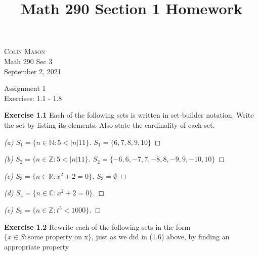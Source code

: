 \documentclass[12pt,oneside]{article}
\newenvironment{exercise}[1]{\vspace{.1in}\noindent\textbf{Exercise #1 \hspace{.05em}}}{}
\newcommand{\R}{\mathbb{R}}
\newcommand{\C}{\mathbb{C}}
\newcommand{\Z}{\mathbb{Z}}
\newcommand{\N}{\mathbb{N}}
\begin{document}
\title{Math 290 Section 1 Homework}

\begin{flushright}
\textsc{Colin Mason}  \\
Math 290 Sec 3\\
September 2, 2021
\end{flushright}

\begin{center}
\textsf{Assignment 1} \\
\textsf{Exercises: 1.1 - 1.8}
\end{center}


\begin{exercise}{1.1}
 Each of the following sets is written in set-builder notation. Write the
set by listing its elements. Also state the cardinality of each set.


\end{exercise}

\begin{proof}[(a) $S_1 = \{n \in \N : 5 < |n| 11\}$]
\item$S_1 = \{6, 7, 8, 9, 10 \}$
\end{proof}

\begin{proof}[(b) $S_2 = \{n \in \Z : 5 < |n| 11\}$]
\item$S_2 = \{-6, 6, -7, 7, -8, 8,-9, 9,-10, 10 \}$
\end{proof}

\begin{proof}[(c) $S_3 = \{n \in \R : x^2 +2 = 0\}$]
\item$S_3 = \emptyset$
\end{proof}

\begin{proof}[(d) $S_4 = \{n \in \C : x^2 +2 = 0\}$]

\end{proof}

\begin{proof}[(e) $S_5 = \{n \in \Z : t^5 < 1000\}$]

\end{proof}





\begin{exercise}{1.2}
Rewrite each of the following sets in the form
$\{x \in S : \text{some property on x}\}$,
just as we did in (1.6) above, by finding an appropriate property


\end{exercise}
\end{document}
